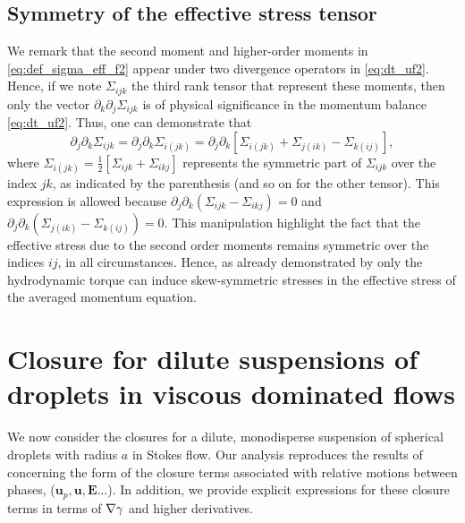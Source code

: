 \subsection{Symmetry of the effective stress tensor}
We remark that the second moment and higher-order moments in \ref{eq:def_sigma_eff_f2} appear under two divergence operators in \ref{eq:dt_uf2}. 
Hence, if we note $\Sigma_{ijk}$ the third rank tensor that represent these moments, then only the vector $\partial_k \partial_j\Sigma_{ijk}$ is of physical significance in the momentum balance \eqref{eq:dt_uf2}.
Thus, one can demonstrate that \citep{lhuillier1996contribution}
\begin{equation}
    \partial_j \partial_k \Sigma_{ijk}
    = \partial_j \partial_k \Sigma_{i(jk)}
    =
    \partial_j \partial_k \left[
        \Sigma_{i(jk)}
        + \Sigma_{j(ik)}
        - \Sigma_{k(ij)}
    \right],
    \label{eq:sym_proof}
\end{equation}
where $\Sigma_{i(jk)} = \frac{1}{2}[\Sigma_{ijk} + \Sigma_{ikj}]$ represents the symmetric part of $\Sigma_{ijk}$ over the index $jk$, as indicated by the parenthesis (and so on for the other tensor). 
This expression is allowed because $\partial_j \partial_k (\Sigma_{ijk} - \Sigma_{ikj}) = 0$ and $\partial_j \partial_k (\Sigma_{j(ik)} - \Sigma_{k(ij)}) = 0$. 
This manipulation highlight the fact that the effective stress due to the second order moments remains symmetric over the indices $ij$, in all circumstances.
Hence, as already demonstrated by \citet{lhuillier1996contribution} only the hydrodynamic torque can induce skew-symmetric stresses in the effective stress of the averaged momentum equation. 



\section{Closure for dilute suspensions of droplets in viscous dominated flows}
\label{sec:closure}
We now consider the closures for a dilute, monodisperse suspension of spherical droplets with radius $a$ in Stokes flow. %
Our analysis reproduces the results of \citet[Appendix B]{zhang1997momentum} concerning the form of the closure terms associated with relative motions between phases, ($\textbf{u}_p, \textbf{u}, \textbf{E}\ldots$). 
In addition, we provide explicit expressions for these closure terms in terms of $\mathbf{\nabla}\gamma$ and higher derivatives. 

